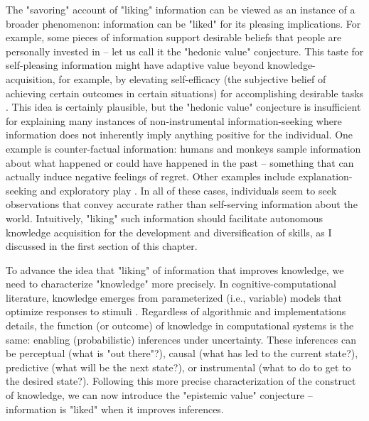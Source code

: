 The "savoring" account of "liking" information can be viewed as an instance of a broader phenomenon: information can be "liked" for its pleasing implications. For example, some pieces of information support desirable beliefs that people are personally invested in \parencite[e.g., confirmation bias][]{nickerson_confirmation_1998} -- let us call it the "hedonic value" conjecture. This taste for self-pleasing information might have adaptive value beyond knowledge-acquisition, for example, by elevating self-efficacy \parencite{bandura_self-efficacy_1977} (the subjective belief of achieving certain outcomes in certain situations) for accomplishing desirable tasks \parencite{bromberg-martin_value_2020}. This idea is certainly plausible, but the "hedonic value" conjecture is insufficient for explaining many instances of non-instrumental information-seeking where information does not inherently imply anything positive for the individual. One example is counter-factual information: humans \parencite{fitzgibbon_lure_2021} and monkeys \parencite{wang_monkeys_2019} sample information about what happened or could have happened in the past -- something that can actually induce negative feelings of regret. Other examples include explanation-seeking \parencite{coenen_asking_2019,liquin_explanation-seeking_2020} and exploratory play \parencite{cook_where_2011,chu_play_2020}. In all of these cases, individuals seem to seek observations that convey accurate rather than self-serving information about the world. Intuitively, "liking" such information should facilitate autonomous knowledge acquisition for the development and diversification of skills, as I discussed in the first section of this chapter.

To advance the idea that "liking" of information that improves knowledge, we need to characterize "knowledge" more precisely. In cognitive-computational literature, knowledge emerges from parameterized (i.e., variable) models that optimize responses to stimuli \parencite[e.g., probabilistic and connectionist cognitive models models][]{mcclelland_letting_2010,griffiths_probabilistic_2010}. Regardless of algorithmic and implementations details, the function (or outcome) of knowledge in computational systems is the same: enabling (probabilistic) inferences under uncertainty. These inferences can be perceptual (what is "out there"?), causal (what has led to the current state?), predictive (what will be the next state?), or instrumental (what to do to get to the desired state?). Following this more precise characterization of the construct of knowledge, we can now introduce the "epistemic value" conjecture -- information is "liked" when it improves inferences.

